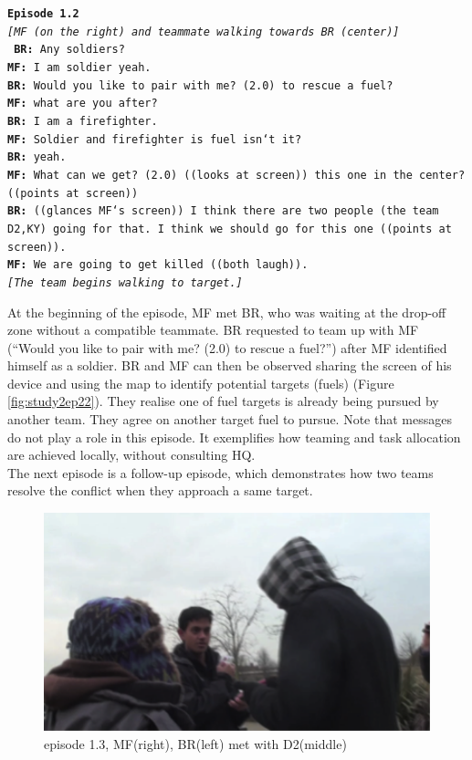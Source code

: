 \noindent\texttt{\textbf{Episode 1.2}\\
\emph{[MF (on the right) and teammate walking towards BR (center)]\\}
\textbf{BR:} Any soldiers?\\
\textbf{MF:} I am soldier yeah.\\
\textbf{BR:} Would you like to pair with me? (2.0) to rescue a fuel?\\
\textbf{MF:} what are you after?\\
\textbf{BR:} I am a firefighter.\\
\textbf{MF:} Soldier and firefighter is fuel isn`t it?\\
\textbf{BR:} yeah.\\
\textbf{MF:} What can we get? (2.0) ((looks at screen)) this one in the center? ((points at screen))\\
\textbf{BR:} ((glances MF`s screen)) I think there are two people (the team D2,KY) going for that. I think we should go for this one ((points at screen)).\\
\textbf{MF:} We are going to get killed ((both laugh)).\\
\emph{[The team begins walking to target.]}\\
}

At the beginning of the episode, MF met BR, who was waiting at the drop-off zone without a compatible teammate. BR requested to team up with MF (``Would you like to pair with me? (2.0) to rescue a fuel?'') after MF identified himself as a soldier. BR and MF can then be observed sharing the screen of his device and using the map to identify potential targets (fuels) (Figure \ref{fig:study2ep22}). They realise one of fuel targets is already being pursued by another team. They agree on another target fuel to pursue. Note that messages do not play a role in this episode. It exemplifies how teaming and task allocation are achieved locally, without consulting HQ. \\

The next episode is a follow-up episode, which demonstrates how two teams resolve the conflict when they approach a same target.\\

\begin{figure}[h]
  \centering
  \includegraphics[width=1\textwidth]{img/study1/ep5/ep51}
  \caption{episode 1.3, MF(right), BR(left) met with D2(middle)}
  \label{fig:intructions}
\end{figure}

